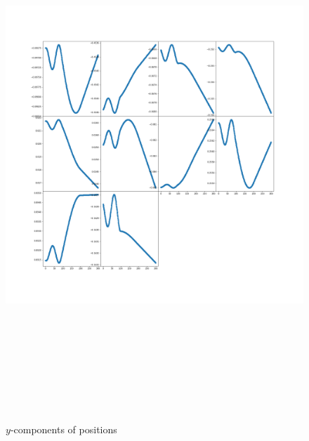 \documentclass[12pt]{article}
\begin{document}
	\begin{figure}[H]
		\includegraphics[width=\linewidth, height=20cm]{subpsy3.png} \caption{$y$-components of positions} \label{subpsy3}
	\end{figure}
\end{document}

